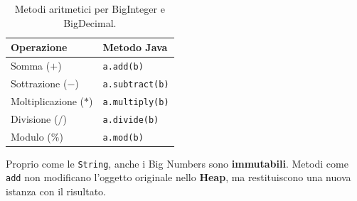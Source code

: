 \begin{table}[ht!]
\centering
\begin{tabular}{@{}ll@{}}
\toprule
\textbf{Operazione} & \textbf{Metodo Java} \\ \midrule
Somma ($+$) & \texttt{a.add(b)} \\
Sottrazione ($-$) & \texttt{a.subtract(b)} \\
Moltiplicazione ($*$) & \texttt{a.multiply(b)} \\
Divisione ($/$) & \texttt{a.divide(b)} \\
Modulo ($\%$) & \texttt{a.mod(b)} \\ \bottomrule
\end{tabular}
\caption{Metodi aritmetici per BigInteger e BigDecimal.}
\end{table}

\begin{observation}[Immutabilità]
    Proprio come le \texttt{String}, anche i Big Numbers sono \textbf{immutabili}. Metodi come \texttt{add} non modificano l'oggetto originale nello \textbf{Heap}, ma restituiscono una nuova istanza con il risultato.
\end{observation}
